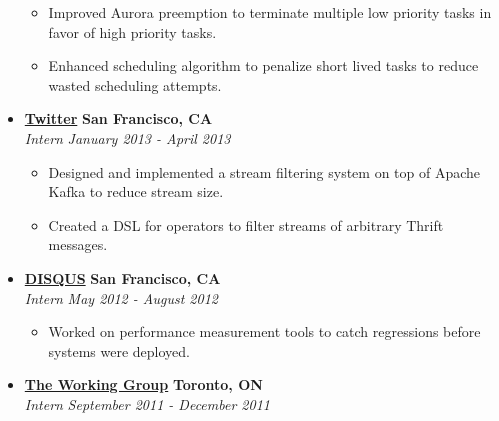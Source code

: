 \documentclass[10pt,letterpaper]{article}
\begin{document}
\begin{itemize}[leftmargin=*]
    \begin{itemize}[label=\textbullet]
      \itemsep0em
      \item Improved Aurora preemption to terminate multiple low priority tasks
        in favor of high priority tasks.
      \item Enhanced scheduling algorithm to penalize short lived tasks to
        reduce wasted scheduling attempts.
    \end{itemize}

    \item[]
    {\href{http://www.twitter.com}{\textbf{Twitter}} \hfill
      \textbf{San Francisco, CA}}
    \\
    {\emph{Intern} \hfill \emph{January 2013 - April 2013}}

    \begin{itemize}[label=\textbullet]
      \itemsep0em
      \item Designed and implemented a stream filtering system on top of Apache
        Kafka to reduce stream size.
      \item Created a DSL for operators to filter streams of arbitrary Thrift
        messages.
    \end{itemize}

    \item[]
    {\href{http://www.disqus.com}{\textbf{DISQUS}} \hfill
      \textbf{San Francisco, CA}}
    \\
    {\emph{Intern} \hfill \emph{May 2012 - August 2012}}

    \begin{itemize}[label=\textbullet]
      \itemsep0em
      \item Worked on performance measurement tools to catch regressions before
        systems were deployed.
    \end{itemize}


    \item[]
    {\href{http://www.twg.ca}{\textbf{The Working Group}} \hfill
      \textbf{Toronto, ON}}
    \\
    {\emph{Intern} \hfill \emph{September 2011 - December 2011}}


\end{itemize}
\end{document}
